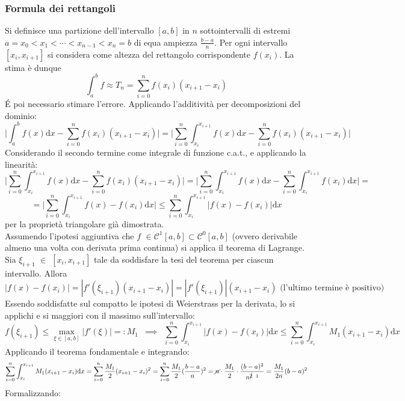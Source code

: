 \documentclass[10pt, oneside]{book}
\theoremstyle{plain}
\begin{document}
\subsubsection{Formula dei rettangoli}
Si definisce una partizione dell'intervallo $[a,b]$ in $n$ sottointervalli di estremi $a = x_0 < x_1 < \cdots < x_{n-1} < x_n = b$ di equa ampiezza $\frac{b-a}{n}$.
Per ogni intervallo $[x_i, x_{i+1}]$ si considera come altezza del rettangolo corrispondente $f(x_i)$. La stima è dunque
\[\int_a^b f \approx T_n = \sum\limits_{i=0}^n f(x_i) (x_{i+1} - x_i)\]
\'E poi necessario stimare l'errore. Applicando l'additività per decomposizioni del dominio:
\[\bigg|\int_a^b f(x)\textrm{d}x - \sum\limits_{i=0}^n f(x_i) (x_{i+1} - x_i)\bigg| = \bigg|\sum\limits_{i=0}^n \int_{x_i}^{x_{i+1}} f(x)\textrm{d}x - \sum\limits_{i=0}^n f(x_i) (x_{i+1} - x_i)\bigg|\]
Considerando il secondo termine come integrale di funzione c.a.t., e applicando la linearità:
\[\bigg|\sum\limits_{i=0}^n \int_{x_i}^{x_{i+1}} f(x)\textrm{d}x - \sum\limits_{i=0}^n f(x_i) (x_{i+1} - x_i)\bigg| = \bigg|\sum\limits_{i=0}^n \int_{x_i}^{x_{i+1}} f(x)\textrm{d}x - \sum\limits_{i=0}^n \int_{x_i}^{x_{i+1}} f(x_i)\textrm{d}x \bigg| = \]
\[= \bigg|\sum\limits_{i=0}^n \int_{x_i}^{x_{i+1}} f(x) - f(x_i)\textrm{d}x \bigg| \leq \sum\limits_{i=0}^n \int_{x_i}^{x_{i+1}} \big|f(x) - f(x_i)\big|\textrm{d}x\]
per la proprietà triangolare già dimostrata.
\\Assumendo l'ipotesi aggiuntiva che $f$ $\in \mathcal{C}^1[a,b] \subset \mathcal{C}^0[a,b]$ (ovvero derivabile almeno una volta con derivata prima continua) si applica il teorema di Lagrange. Sia $\xi_{i+1}$ $\in$ $[x_i, x_{i+1}]$ tale da soddisfare la tesi del teorema per ciascun intervallo. Allora
\[|f(x) - f(x_i)| = |f'(\xi_{i+1}) (x_{i+1} - x_i)| = |f'(\xi_{i+1})| (x_{i+1} - x_i) \textrm{ (l'ultimo termine è positivo)}\]
Essendo soddisfatte sul compatto le ipotesi di Weierstrass per la derivata, lo si applichi e si maggiori con il massimo sull'intervallo:
\[f(\xi_{i+1}) \leq \max\limits_{\xi \in [a,b]} |f'(\xi)| =: M_1 \enspace \implies \enspace \sum\limits_{i=0}^n \int_{x_i}^{x_{i+1}} \big|f(x) - f(x_i)\big|\textrm{d}x \leq \sum\limits_{i=0}^n \int_{x_i}^{x_{i+1}} M_1 (x_{i+1} - x_i)\textrm{d}x\]
Applicando il teorema fondamentale e integrando:
\[\sum\limits_{i=0}^n \int_{x_i}^{x_{i+1}} M_1 (x_{i+1} - x_i)\textrm{d}x = \sum\limits_{i=0}^n \frac{M_1}{2}(x_{i+1} - x_i)^2 = \sum\limits_{i=0}^n \frac{M_1}{2}(\frac{b-a}{n})^2 = \cancel{n} \cdot \frac{M_1}{2} \cdot \frac{(b-a)^2}{n^{\cancel{2} \enspace 1}} = \frac{M_1}{2n}(b-a)^2\]
Formalizzando:
\end{document}
